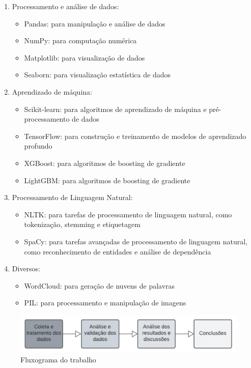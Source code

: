 \begin{enumerate}
    \item Processamento e análise de dados:
          \begin{itemize}
              \item Pandas: para manipulação e análise de dados
              \item NumPy: para computação numérica
              \item Matplotlib: para visualização de dados
              \item Seaborn: para visualização estatística de dados
          \end{itemize}
    \item Aprendizado de máquina:
          \begin{itemize}
              \item Scikit-learn: para algoritmos de aprendizado de máquina e pré-processamento de dados
              \item TensorFlow: para construção e treinamento de modelos de aprendizado profundo
              \item XGBoost: para algoritmos de boosting de gradiente
              \item LightGBM: para algoritmos de boosting de gradiente
          \end{itemize}
    \item Processamento de Linguagem Natural:
          \begin{itemize}
              \item NLTK: para tarefas de processamento de linguagem natural, como tokenização, stemming e etiquetagem
              \item SpaCy: para tarefas avançadas de processamento de linguagem natural, como reconhecimento de entidades e análise de dependência
          \end{itemize}
    \item Diversos:
          \begin{itemize}
              \item WordCloud: para geração de nuvens de palavras
              \item PIL: para processamento e manipulação de imagens
          \end{itemize}
\end{enumerate}
\begin{figure}[H]
    \centering
    \includegraphics[width=\linewidth, scale=0.6]{./figs/process_diagram.png}
    \caption{Fluxograma do trabalho}
    \label{fig:process}
\end{figure}

